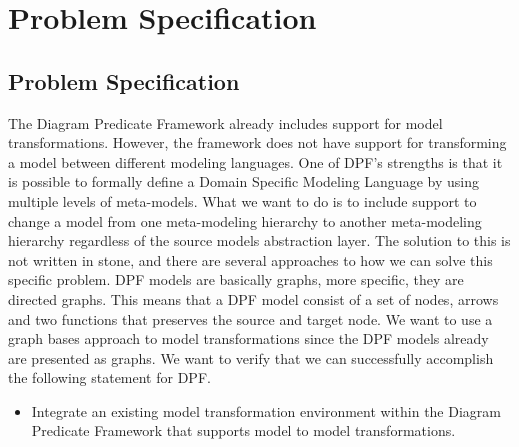 
\chapter{Problem Specification} %

\label{Chapter4} %



\section{Problem Specification}
\label{problem}

The Diagram Predicate Framework already includes support for model
transformations. However, the framework does not have support for transforming
a model between different modeling languages. One of DPF's strengths is that it
is possible to formally define a Domain Specific Modeling Language by using
multiple levels of meta-models. What we want to do is to include support to
change a model from one meta-modeling hierarchy to another meta-modeling
hierarchy regardless of the source models abstraction layer. The solution to
this is not written in stone, and there are several approaches to how we can
solve this specific problem. DPF models are basically graphs, more specific,
they are directed graphs. This means that a DPF model consist of a set of
nodes, arrows and two functions that preserves the source and target node. We
want to use a graph bases approach to model transformations since the DPF models
already are presented as graphs. We want to verify that we can successfully
accomplish the following statement for DPF.

\begin{itemize}
  
  \item Integrate an existing model transformation environment within the
  Diagram Predicate Framework that supports model to model transformations.

\end{itemize}

